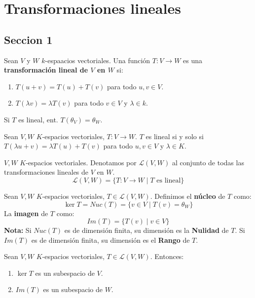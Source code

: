 \chapter{Transformaciones lineales}
\section{Seccion 1}
\begin{definition}{}{}
    Sean $V$ y $W$ $k$-espaacios vectoriales. Una función $T: V\rightarrow W$ es una \textbf{transformación lineal de $V$ en $W$} si:
    \begin{enumerate}
        \item $T(u+v)=T(u)+T(v)$ para todo $u,v\in V$.
        \item $T(\lambda v)=\lambda T(v)$ para todo $v\in V$ y $\lambda\in k$.
    \end{enumerate}
\end{definition}
\begin{obs}{}{}
    Si $T$ es lineal, ent. $T(\theta_V) = \theta_W$.
\end{obs}
\begin{proposition}{}{}
    Sean $V,W$ $K$-espacios vectoriales, $T:V \rightarrow W$. $T$ es lineal si y solo si $T(\lambda u + v) = \lambda T(u) + T(v)$ para todo $u,v\in V$ y $\lambda\in K$.
\end{proposition}
\begin{notation}{}{}
    $V,W$ $K$-espacios vectoriales. Denotamos por $\mathcal{L}(V,W)$ al conjunto de todas las transformaciones lineales de $V$ en $W$.
    $$\mathcal{L}(V,W) = \{T: V \rightarrow W \mid T \text{ es lineal}\}$$
\end{notation}
\begin{definition}{}{}
    Sean $V, W$ $K$-espacios vectoriales, $T \in \mathcal{L}(V,W)$. Definimos el \textbf{núcleo} de $T$ como:
    $$\ker T = Nuc(T) = \{v \in V \mid T(v) = \theta_W\}$$
    La \textbf{imagen} de $T$ como:
    $$Im(T) = \{T(v) \mid v \in V\}$$
    \textbf{Nota: } Si $Nuc(T)$ es de dimensión finita, su dimensión es la \textbf{Nulidad} de $T$.
    Si $Im(T)$ es de dimensión finita, su dimensión es el \textbf{Rango} de $T$.
\end{definition}
\begin{proposition}{}{}
    Sean $V,W$ $K$-espacios vectoriales, $T \in \mathcal{L}(V,W)$. Entonces:
    \begin{enumerate}
        \item $\ker T$ es un subespacio de $V$.
        \item $Im(T)$ es un subespacio de $W$.
    \end{enumerate}
\end{proposition}

